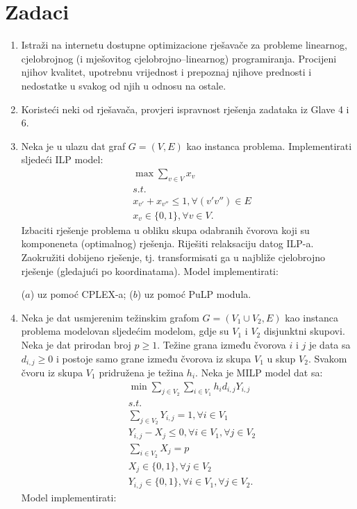 \documentclass[a4paper, utf8, 11pt, colorlinks]{book}
\theoremstyle{definition}
\begin{document}
\section{Zadaci}
\begin{enumerate}
	\item Istraži na internetu dostupne optimizacione  rješavače za probleme linearnog, cjelobrojnog (i mješovitog cjelobrojno--linearnog) programiranja. Procijeni njihov kvalitet, upotrebnu vrijednost i prepoznaj njihove prednosti i nedostatke u svakog od njih u odnosu na ostale.
	
	\item Koristeći neki od rješavača, provjeri ispravnost rješenja zadataka iz Glave 4 i 6.
	
	\item Neka je u ulazu dat graf  $G = (V, E)$ kao instanca problema. Implementirati sljedeći ILP model:
	\begin{align*}
		& \max \sum_{v \in V} x_v \\
		& s.t. \\
		& x_{v'} + x_{v''} \leq 1, \forall (v' v'')\in E \\
		& x_v \in \{0, 1 \}, \forall v \in  V.
	\end{align*}
Izbaciti rješenje problema u obliku skupa odabranih čvorova koji su komponeneta (optimalnog) rješenja. Riješiti relaksaciju datog ILP-a. Zaokružiti dobijeno rješenje, tj. transformisati ga u najbliže cjelobrojno rješenje (gledajući po koordinatama).  Model implementirati:

 ($a$) uz pomoć CPLEX-a; ($b$) uz pomoć PuLP modula.
\item %
     Neka je dat usmjerenim težinskim grafom $G= (V_1 \cup V_2, E)$ kao instanca problema modelovan sljedećim modelom, gdje su $V_1$ i $V_2$ disjunktni skupovi. Neka je dat prirodan broj $p\geq 1$. Težine grana između čvorova $i$ i $j$ je data sa $d_{i,j}\geq 0 $ i postoje samo grane između čvorova iz skupa $V_1$ u skup $V_2$. Svakom čvoru iz skupa $V_1$ pridružena je težina $h_{i}$. 
     Neka je MILP model dat  sa:
     \begin{align*}
     	 &\min \sum_{j \in V_2}\sum_{i \in V_1} h_i d_{i,j} Y_{i,j} \\
     	 &s.t. \\
     	 & \sum_{j \in V_2} Y_{i, j} = 1, \forall i \in V_1 \\
     	 & Y_{i,j} - X_j \leq 0, \forall i  \in V_1, \forall j \in V_2 \\     	 
     	 & \sum_{i \in V_2} X_j  = p \\
     	 & X_j \in \{0, 1\}, \forall j \in V_2 \\
     	 & Y_{i,j} \in \{0, 1\}, \forall i \in V_1, \forall j \in V_2.
     \end{align*}
      Model implementirati:
      

\end{enumerate}
\end{document}
